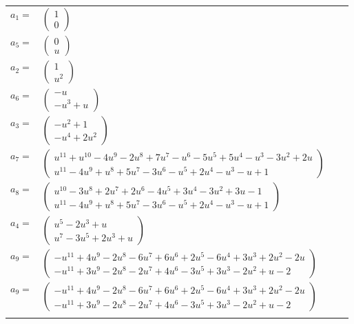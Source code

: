 \documentclass[1p]{elsarticle_modified}
\theoremstyle{definition}
\begin{document}
\begin{tabular}{m{7pt} m{180pt} m{7pt} m{180pt} }
\flushright $a_{1}=$&$\begin{pmatrix}1\\0\end{pmatrix}$ \\
\flushright $a_{5}=$&$\begin{pmatrix}0\\u\end{pmatrix}$ \\
\flushright $a_{2}=$&$\begin{pmatrix}1\\u^2\end{pmatrix}$ \\
\flushright $a_{6}=$&$\begin{pmatrix}- u\\- u^3+u\end{pmatrix}$ \\
\flushright $a_{3}=$&$\begin{pmatrix}- u^2+1\\- u^4+2 u^2\end{pmatrix}$ \\
\flushright $a_{7}=$&$\begin{pmatrix}u^{11}+u^{10}-4 u^9-2 u^8+7 u^7- u^6-5 u^5+5 u^4- u^3-3 u^2+2 u\\u^{11}-4 u^9+u^8+5 u^7-3 u^6- u^5+2 u^4- u^3- u+1\end{pmatrix}$ \\
\flushright $a_{8}=$&$\begin{pmatrix}u^{10}-3 u^8+2 u^7+2 u^6-4 u^5+3 u^4-3 u^2+3 u-1\\u^{11}-4 u^9+u^8+5 u^7-3 u^6- u^5+2 u^4- u^3- u+1\end{pmatrix}$ \\
\flushright $a_{4}=$&$\begin{pmatrix}u^5-2 u^3+u\\u^7-3 u^5+2 u^3+u\end{pmatrix}$ \\
\flushright $a_{9}=$&$\begin{pmatrix}- u^{11}+4 u^9-2 u^8-6 u^7+6 u^6+2 u^5-6 u^4+3 u^3+2 u^2-2 u\\- u^{11}+3 u^9-2 u^8-2 u^7+4 u^6-3 u^5+3 u^3-2 u^2+u-2\end{pmatrix}$\\ \flushright $a_{9}=$&$\begin{pmatrix}- u^{11}+4 u^9-2 u^8-6 u^7+6 u^6+2 u^5-6 u^4+3 u^3+2 u^2-2 u\\- u^{11}+3 u^9-2 u^8-2 u^7+4 u^6-3 u^5+3 u^3-2 u^2+u-2\end{pmatrix}$\\&\end{tabular}
\end{document}
